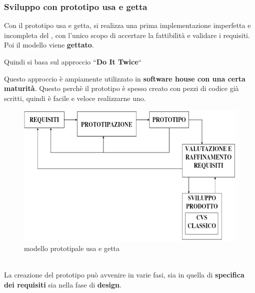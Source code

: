 \subsubsection{Sviluppo con prototipo usa e getta}
Con il prototipo usa e getta, si realizza una prima implementazione imperfetta e incompleta 
del \sw, con l'unico scopo di accertare la fattibilit\`a e validare i requisiti.
Poi il modello viene \textbf{gettato}.

Quindi si basa sul approccio ``\textbf{Do It Twice}``

Questo approccio \`e ampiamente utilizzato in \textbf{software house con una certa maturit\`a}. Questo perch\`e 
il prototipo \`e spesso creato con pezzi di codice gi\`a scritti, quindi \`e  facile e veloce realizzarne
uno.
\begin{figure}[htbp]
    \centering    
    \includegraphics[scale=0.7]{modello_usa_e_gettta.PNG}
    \caption{modello prototipale usa e getta}
    \label{fig:prototipale usa e getta}
\end{figure}   
\\
La creazione del prototipo pu\`o avvenire in varie fasi, sia in quella di \textbf{specifica dei requisiti}
sia nella fase di \textbf{design}.
\newpage
